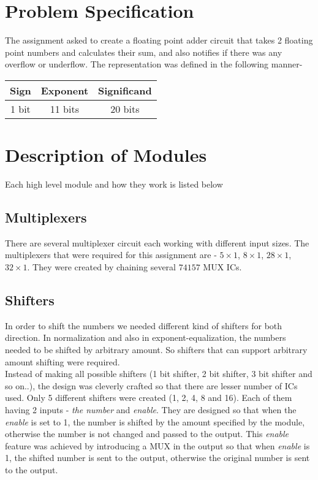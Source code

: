 \documentclass[14pt]{article}
\begin{document}
\pagebreak

\section{Problem Specification}
The assignment asked to create a floating point adder circuit that takes 2 floating point numbers and calculates their sum, and also notifies if there was any overflow or underflow. The representation was defined in the following manner- \\

{
	\centering
	\begin{tabular}{|c|c|c|}
		\hline
		\textbf{Sign} & \textbf{Exponent} & \textbf{Significand}\\
		\hline
		1 bit & 11 bits & 20 bits\\
		\hline
	\end{tabular}\par
}

\section{Description of Modules}
Each high level module and how they work is listed below

\subsection{Multiplexers}
There are several multiplexer circuit each working with different input sizes. The multiplexers that were required for this assignment are - $5\times1$, $8\times1$, $28\times1$, $32\times1$. They were created by chaining several $74157$ MUX ICs.

\subsection{Shifters}\label{shifter_section}
In order to shift the numbers we needed different kind of shifters for both direction. In normalization and also in exponent-equalization, the numbers needed to be shifted by arbitrary amount. So shifters that can support arbitrary amount shifting were required.\\

Instead of making all possible shifters (1 bit shifter, 2 bit shifter, 3 bit shifter and so on..), the design was cleverly crafted so that there are lesser number of ICs used. Only 5 different shifters were created (1, 2, 4, 8 and 16). Each of them having 2 inputs - \textit{the number} and \textit{enable}. They are designed so that when the \textit{enable} is set to 1, the number is shifted by the amount specified by the module, otherwise the number is not changed and passed to the output. This \textit{enable} feature was achieved by introducing a MUX in the output so that when \textit{enable} is 1, the shifted number is sent to the output, otherwise the original number is sent to the output.\\
\end{document}
